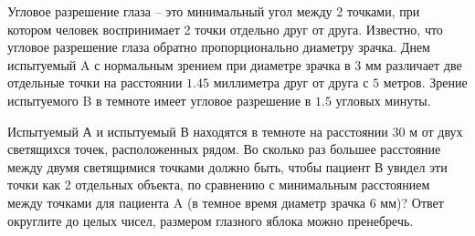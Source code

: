 
Угловое
разрешение глаза – это минимальный угол между 2 точками, при котором человек
воспринимает 2 точки отдельно друг от друга. Известно, что угловое разрешение
глаза обратно пропорционально диаметру зрачка. Днем испытуемый A с нормальным
зрением при диаметре зрачка в $3$  мм различает две отдельные точки на расстоянии
$1.45$  миллиметра друг от друга с $5$  метров. Зрение испытуемого B в темноте имеет
угловое разрешение в $1.5$  угловых минуты. 

Испытуемый А и испытуемый В находятся в темноте на расстоянии
$30$ м от двух светящихся точек, расположенных рядом.  Во сколько раз большее расстояние между двумя
светящимися точками должно быть, чтобы пациент В увидел эти точки как 2
отдельных объекта, по сравнению с минимальным расстоянием между точками для
пациента A (в темное время диаметр зрачка $6$  мм)? Ответ округлите до целых
чисел, размером глазного яблока можно пренебречь.



